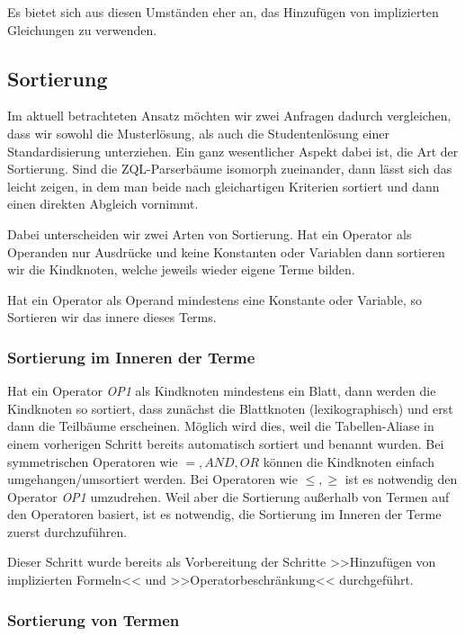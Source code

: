 Es bietet sich aus diesen Umständen eher an, das Hinzufügen von implizierten Gleichungen zu verwenden.

\subsection{Sortierung}

Im aktuell betrachteten Ansatz möchten wir zwei Anfragen dadurch vergleichen, dass wir sowohl die Musterlösung, als auch die Studentenlösung einer Standardisierung unterziehen. Ein ganz wesentlicher Aspekt dabei ist, die Art der Sortierung. Sind die ZQL-Parserbäume isomorph zueinander, dann lässt sich das leicht zeigen, in dem man beide nach gleichartigen Kriterien sortiert und dann einen direkten Abgleich vornimmt.

Dabei unterscheiden wir zwei Arten von Sortierung. Hat ein Operator als Operanden nur Ausdrücke und keine Konstanten oder Variablen dann sortieren wir die Kindknoten, welche jeweils wieder eigene Terme bilden.

Hat ein Operator als Operand mindestens eine Konstante oder Variable, so Sortieren wir das innere dieses Terms.

\subsubsection{Sortierung im Inneren der Terme}

Hat ein Operator \textit{OP1} als Kindknoten mindestens ein Blatt, dann werden die Kindknoten so sortiert, dass zunächst die Blattknoten (lexikographisch) und erst dann die Teilbäume erscheinen. Möglich wird dies, weil die Tabellen-Aliase in einem vorherigen Schritt bereits automatisch sortiert und benannt wurden. Bei symmetrischen Operatoren wie $=,  \textit{AND}, \textit{OR}$ können die Kindknoten einfach umgehangen/umsortiert werden. Bei Operatoren wie $\le,\ge$ ist es notwendig den Operator \textit{OP1} umzudrehen. Weil aber die Sortierung außerhalb von Termen auf den Operatoren basiert, ist es notwendig, die Sortierung im Inneren der Terme zuerst durchzuführen.

Dieser Schritt wurde bereits als Vorbereitung der Schritte >>Hinzufügen von implizierten Formeln<< und >>Operatorbeschränkung<< durchgeführt. 

\subsubsection{Sortierung von Termen}

